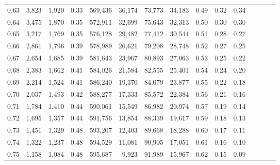 \begin{tabular}{rrrcrrrrrrrrrrr}
0.63 &   3,823 &  1,920 &                                       0.33 &  569,436 &   36,174 &   73,773 &   34,183 &  0.49 &  0.32 &                         0.34 \\
0.64 &   3,475 &  1,870 &                                       0.35 &  572,911 &   32,699 &   75,643 &   32,313 &  0.50 &  0.30 &                         0.30 \\
0.65 &   3,217 &  1,769 &                                       0.35 &  576,128 &   29,482 &   77,412 &   30,544 &  0.51 &  0.28 &                         0.27 \\
0.66 &   2,861 &  1,796 &                                       0.39 &  578,989 &   26,621 &   79,208 &   28,748 &  0.52 &  0.27 &                         0.25 \\
0.67 &   2,654 &  1,685 &                                       0.39 &  581,643 &   23,967 &   80,893 &   27,063 &  0.53 &  0.25 &                         0.22 \\
0.68 &   2,383 &  1,662 &                                       0.41 &  584,026 &   21,584 &   82,555 &   25,401 &  0.54 &  0.24 &                         0.20 \\
0.69 &   2,214 &  1,524 &                                       0.41 &  586,240 &   19,370 &   84,079 &   23,877 &  0.55 &  0.22 &                         0.18 \\
0.70 &   2,037 &  1,493 &                                       0.42 &  588,277 &   17,333 &   85,572 &   22,384 &  0.56 &  0.21 &                         0.16 \\
0.71 &   1,784 &  1,410 &                                       0.44 &  590,061 &   15,549 &   86,982 &   20,974 &  0.57 &  0.19 &                         0.14 \\
0.72 &   1,695 &  1,357 &                                       0.44 &  591,756 &   13,854 &   88,339 &   19,617 &  0.59 &  0.18 &                         0.13 \\
0.73 &   1,451 &  1,329 &                                       0.48 &  593,207 &   12,403 &   89,668 &   18,288 &  0.60 &  0.17 &                         0.11 \\
0.74 &   1,322 &  1,237 &                                       0.48 &  594,529 &   11,081 &   90,905 &   17,051 &  0.61 &  0.16 &                         0.10 \\
0.75 &   1,158 &  1,084 &                                       0.48 &  595,687 &    9,923 &   91,989 &   15,967 &  0.62 &  0.15 &                         0.09 \\

\end{tabular}
